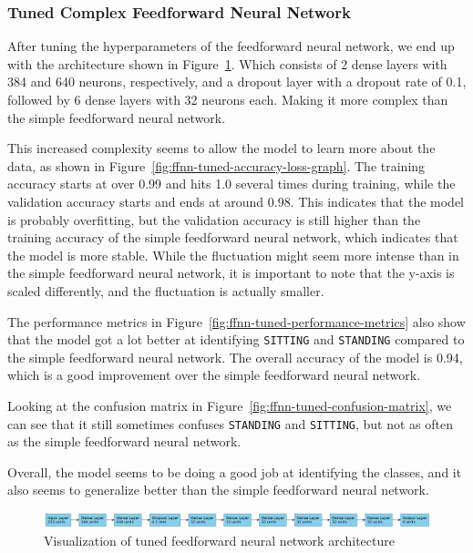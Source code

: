 \subsubsection{Tuned Complex Feedforward Neural Network}

After tuning the hyperparameters of the feedforward neural network,
we end up with the architecture shown in Figure~\ref{fig:fnn-best-params}.
Which consists of 2 dense layers with 384 and 640 neurons, respectively, and a dropout layer with a dropout rate of 0.1,
followed by 6 dense layers with 32 neurons each.
Making it more complex than the simple feedforward neural network.

This increased complexity seems to allow the model to learn more about the data,
as shown in Figure~\ref{fig:ffnn-tuned-accuracy-loss-graph}.
The training accuracy starts at over 0.99 and hits 1.0 several times during training,
while the validation accuracy starts and ends at around 0.98.
This indicates that the model is probably overfitting,
but the validation accuracy is still higher than the training accuracy of the simple feedforward neural network,
which indicates that the model is more stable.
While the fluctuation might seem more intense than in the simple feedforward neural network,
it is important to note that the y-axis is scaled differently,
and the fluctuation is actually smaller.

The performance metrics in Figure~\ref{fig:ffnn-tuned-performance-metrics} also show
that the model got
a lot better at identifying \texttt{SITTING} and \texttt{STANDING} compared to the simple feedforward neural network.
The overall accuracy of the model is 0.94, which is a good improvement over the simple feedforward neural network.

Looking at the confusion matrix in Figure~\ref{fig:ffnn-tuned-confusion-matrix},
we can see that it still sometimes confuses \texttt{STANDING} and \texttt{SITTING},
but not as often as the simple feedforward neural network.

Overall, the model seems to be doing a good job at identifying the classes, and it also seems to generalize better than the simple feedforward neural network.

\begin{figure}[ht]
    \centering
    \includegraphics[width=\textwidth]{./img/ffnn/tuned/fnn-best-params}
    \caption{Visualization of tuned feedforward neural network architecture}
    \label{fig:fnn-best-params}
\end{figure}

